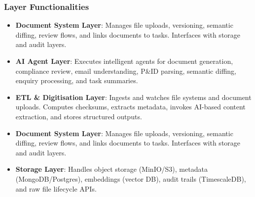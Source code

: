\begin{frame}
  \frametitle{Layer Functionalities}
  \begin{itemize}
    \item \textbf{Document System Layer}: Manages file uploads, versioning, semantic diffing, review flows, and links documents to tasks. Interfaces with storage and audit layers.
    \item \textbf{AI Agent Layer}: Executes intelligent agents for document generation, compliance review, email understanding, P\&ID parsing, semantic diffing, enquiry processing, and task summaries.
    \item \textbf{ETL \& Digitisation Layer}: Ingests and watches file systems and document uploads. Computes checksums, extracts metadata, invokes AI-based content extraction, and stores structured outputs.
    \item \textbf{Document System Layer}: Manages file uploads, versioning, semantic diffing, review flows, and links documents to tasks. Interfaces with storage and audit layers.
    \item \textbf{Storage Layer}: Handles object storage (MinIO/S3), metadata (MongoDB/Postgres), embeddings (vector DB), audit trails (TimescaleDB), and raw file lifecycle APIs.
  \end{itemize}
\end{frame}

  


